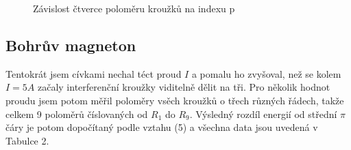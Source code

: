 \documentclass[a4paper,11pt]{article}
\begin{document}
\begin{figure}[htpb]
    \centering
    
    \captionsetup{type=graph}
    \caption{Závislost čtverce poloměru kroužků na indexu p}
\end{figure}

\subsection{Bohrův magneton}

Tentokrát jsem cívkami nechal téct proud $ I $ a pomalu ho zvyšoval, než se kolem $ I = 5 A $ začaly interferenční kroužky viditelně dělit na tři. Pro několik hodnot proudu jsem potom měřil poloměry vsěch kroužků o třech různých řádech, takže celkem 9 poloměrů číslovaných od $ R_1 $ do $ R_9 $. Výsledný rozdíl energií od střední $ \pi $ čáry je potom dopočítaný podle vztahu (5) a všechna data jsou uvedená v Tabulce 2. 
\end{document}
